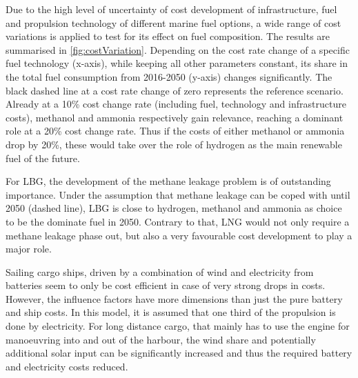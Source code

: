 \documentclass[article]{elsarticle}
\begin{document}


Due to the high level of uncertainty of cost development of infrastructure, fuel and propulsion technology of different marine fuel options, a wide range of cost variations is applied to test for its effect on fuel composition. The results are summarised in \autoref{fig:costVariation}. Depending on the cost rate change of a specific fuel technology (x-axis), while keeping all other parameters constant, its share in the total fuel consumption from 2016-2050 (y-axis) changes significantly. The black dashed line at a cost rate change of zero represents the reference scenario. Already at a 10\% cost change rate (including fuel, technology and infrastructure costs), methanol and ammonia respectively gain relevance, reaching a dominant role at a 20\% cost change rate. Thus if the costs of either methanol or ammonia drop by 20\%, these would take over the role of hydrogen as the main renewable fuel of the future.

For LBG, the development of the methane leakage problem is of outstanding importance. Under the assumption that methane leakage can be coped with until 2050 (dashed line), LBG is close to hydrogen, methanol and ammonia as choice to be the dominate fuel in 2050. Contrary to that, LNG would not only require a methane leakage phase out, but also a very favourable cost development to play a major role.

Sailing cargo ships, driven by a combination of wind and electricity from batteries seem to only be cost efficient in case of very strong drops in costs. However, the influence factors have more dimensions than just the pure battery and ship costs. In this model, it is assumed that one third of the propulsion is done by electricity. For long distance cargo, that mainly has to use the engine for manoeuvring into and out of the harbour, the wind share and potentially additional solar input can be significantly increased and thus the required battery and electricity costs reduced.
\end{document}
